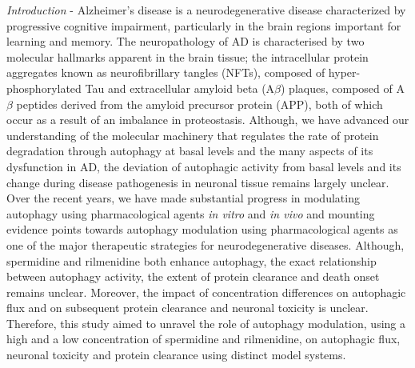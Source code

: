 \textit{Introduction} - Alzheimer’s disease is a neurodegenerative disease characterized by progressive cognitive impairment, particularly in the brain regions important for learning and memory. The neuropathology of AD is characterised by two molecular hallmarks apparent in the brain tissue; the intracellular protein aggregates known as neurofibrillary tangles (NFTs), composed of hyper-phosphorylated Tau and extracellular amyloid beta (A$\beta$) plaques, composed of A$\beta$ peptides derived from the amyloid precursor protein (APP), both of which occur as a result of an imbalance in proteostasis. Although, we have advanced our understanding of the molecular machinery that regulates the rate of protein degradation through autophagy at basal levels and the many aspects of its dysfunction in AD, the deviation of autophagic activity from basal levels and its change during disease pathogenesis in neuronal tissue remains largely unclear. Over the recent years, we have made substantial progress in modulating autophagy using pharmacological agents \textit{in vitro} and \textit{in vivo} and mounting evidence points towards autophagy modulation using pharmacological agents as one of the major therapeutic strategies for neurodegenerative diseases. Although, spermidine and rilmenidine both enhance autophagy, the exact relationship between autophagy activity, the extent of protein clearance and death onset remains unclear. Moreover, the impact of concentration differences on autophagic flux and on subsequent protein clearance and neuronal toxicity is unclear. Therefore, this study aimed to unravel the role of autophagy modulation, using a high and a low concentration of spermidine and rilmenidine, on autophagic flux, neuronal toxicity and protein clearance using distinct model systems. 

